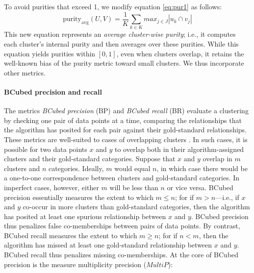 To avoid purities that exceed 1, we modify equation \eqref{eq:pur1} as follows: 
\begin{equation} \label{eq:pur2}
\text{purity}_{\text{avg}}(U, V) =  \frac{1}{K} \sum_{k \in K} max_{j \in J} |u_k \cap v_j|
\end{equation}
This new equation represents an \emph{average cluster-wise purity}; i.e., it computes each cluster's internal purity and then averages over these purities. %
While this equation yields purities within $[0, 1]$, even 
when clusters overlap, it retains the well-known bias of the purity metric toward small clusters. We thus incorporate other metrics. 

\paragraph{BCubed precision and recall}
The metrics \emph{BCubed precision} (BP) and \emph{BCubed recall} (BR) \citep{bagga-and-baldwin:1998} evaluate a clustering by checking one 
pair of data points at a time, comparing the relationships that the algorithm has posited for each pair against their 
gold-standard relationships. These metrics are well-suited to cases of overlapping 
clusters \citep{amigo-et-al:2009}. 
In such cases, it is possible for two data points $x$ and $y$ to overlap both in their algorithm-assigned clusters and their 
gold-standard categories. Suppose that $x$ and $y$ overlap in $m$ clusters and $n$ categories. Ideally, $m$ would 
equal $n$, in which case there would be a one-to-one correspondence between clusters and gold-standard categories. 
In imperfect cases, however, either $m$ will be less than $n$ or vice versa. BCubed precision essentially 
measures the extent to which $m \leq n$; for if $m>n$---i.e., if $x$ and $y$ co-occur in more clusters than gold-standard categories, then the algorithm has posited at least one 
spurious relationship between $x$ and $y$. BCubed precision thus penalizes false co-memberships between pairs of data points. 
By contrast, BCubed recall measures the extent to which $m \geq n$; for if $n<m$, then the algorithm 
has missed at least one gold-standard relationship between $x$ and $y$. BCubed recall thus 
penalizes missing co-memberships. %
At the core of BCubed precision is the measure multiplicity precision ($MultiP$):
